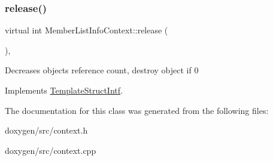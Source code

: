 \mbox{\label{class_member_list_info_context_a86721904ec41349332da05e5cb3325d9}} 
\subsubsection{\texorpdfstring{release()}{release()}}
{\footnotesize\ttfamily virtual int Member\+List\+Info\+Context\+::release (\begin{DoxyParamCaption}{ }\end{DoxyParamCaption})\hspace{0.3cm}{\ttfamily [inline]}, {\ttfamily [virtual]}}

Decreases object\textquotesingle{}s reference count, destroy object if 0 

Implements \mbox{\hyperlink{class_template_struct_intf_a3dce7dd29d3f66a8080b40578e8a5045}{Template\+Struct\+Intf}}.



The documentation for this class was generated from the following files\+:\begin{DoxyCompactItemize}
\item 
doxygen/src/context.\+h\item 
doxygen/src/context.\+cpp\end{DoxyCompactItemize}
